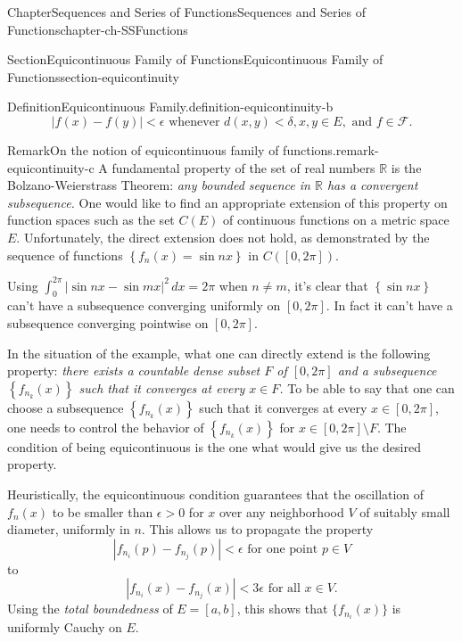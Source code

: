 \documentclass[oneside,10pt,]{book}
\numberwithin{equation}{section}
\begin{document}
\begin{chapterptx}{Chapter}{Sequences and Series of Functions}{}{Sequences and Series of Functions}{}{}{chapter-ch-SSFunctions}
\begin{sectionptx}{Section}{Equicontinuous Family of Functions}{}{Equicontinuous Family of Functions}{}{}{section-equicontinuity}
\begin{definition}{Definition}{Equicontinuous Family.}{definition-equicontinuity-b}
\begin{equation}
|f(x)-f(y)| < \epsilon \text{ whenever } d(x, y) < \delta, x, y \in E, \text{ and } f \in \mathcal F.\label{men-equicont}
\end{equation}
%
\end{definition}
\begin{remark}{Remark}{On the notion of equicontinuous family of functions.}{remark-equicontinuity-c}%
A fundamental property of the set of real numbers \(\mathbb R\) is the Bolzano-Weierstrass Theorem: \emph{any bounded sequence in \(\mathbb R\) has a convergent subsequence.} One would like to find an appropriate	 extension of this property on function spaces such as the set \(C(E)\) of continuous functions on a metric space \(E\). Unfortunately, the direct extension does not hold, as demonstrated by the sequence of functions \(\left\{f_{n}(x)=\sin n x\right\}\) in \(C([0,2\pi])\).%
\par
Using \(\int_{0}^{2\pi} |\sin nx -\sin m x|^{2}\, dx =2\pi\) when \(n\ne m\), it's clear that \(\left\{\sin n x\right\}\) can't have a subsequence converging uniformly on \([0, 2\pi]\). In fact it can't have a subsequence converging pointwise  on  \([0, 2\pi]\).%
\par
In the situation of the example, what one can directly extend is the following property: \emph{there exists a countable dense subset \(F\) of \([0,2\pi]\) and a subsequence \(\left\{ f_{n_{k}}(x) \right\}\) such that it converges at every \(x\in F\).} To be able to say that one can choose a subsequence \(\left\{ f_{n_{k}}(x) \right\}\) such that it converges at every \(x\in [0,2\pi]\), one needs to control the behavior of \(\left\{ f_{n_{k}}(x) \right\}\) for \(x\in [0,2\pi]\setminus F\). The condition of being equicontinuous is the one what would give us the desired property.%
\par
Heuristically, the equicontinuous condition guarantees that  the oscillation of \(f_{n}(x)\) to be smaller than \(\epsilon > 0\) for \(x\) over any neighborhood \(V\) of suitably small diameter, uniformly in \(n\). This allows us to propagate the property%
\begin{equation*}
|f_{n_{i}}(p)-f_{n_{j}}(p)| < \epsilon \text{ for one point } p \in V
\end{equation*}
to%
\begin{equation*}
|f_{n_{i}}(x)-f_{n_{j}}(x)| < 3\epsilon \text{ for all } x \in V.
\end{equation*}
Using  the \emph{total boundedness} of \(E=[a, b]\), this shows that \(\{ f_{n_{i}}(x)\}\) is uniformly Cauchy on \(E\).%

\end{remark}
\end{sectionptx}
\end{chapterptx}
\end{document}
